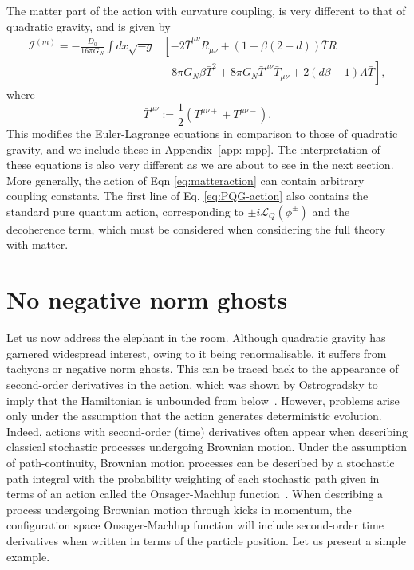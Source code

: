 \documentclass[aps,preprintnumbers,superscriptaddress,longbibliography]{revtex4-1}
\begin{document}
The matter part of the action with curvature coupling, is very different to that of quadratic gravity, and is given 
by   
\begin{equation}
\label{eq:matteraction}
\begin{split}
\mathcal{I}^{(m)}=
-\frac{D_0}{16 \pi G_N} \int dx \sqrt{-g} &
\left[-2 \bar{T}^{\mu\nu}R_{\mu\nu}+\left(1+\beta(2-d)\right) \bar{T}R \right.\\
&\left. - 8\pi G_N \beta\bar{T}^2+8\pi G_N \bar{T}^{\mu\nu}\bar{T}_{\mu\nu}+2 (d\beta-1)\Lambda\bar{T}
\right],
\end{split}
\end{equation}
where 
$$
\bar{T}^{\mu\nu}:=\frac{1}{2}\left({T}^{\mu\nu+}+{T}^{\mu\nu-}\right).
$$
This modifies the Euler-Lagrange equations in comparison to those of quadratic gravity, and we include these in Appendix~\ref{app: mpp}. The interpretation of these equations is also very different as we are about to see in the next section. More generally, the action of Eqn \eqref{eq:matteraction} can contain arbitrary coupling constants. The first line of Eq. \eqref{eq:PQG-action} also contains the standard pure quantum action, corresponding to $\pm i\mathcal{L}_Q(\phi^\pm)$ and the decoherence term, which must be considered when considering the full theory with matter. 


\section{No negative norm ghosts}
\label{sec:noghosts}
Let us now address the elephant in the room. Although quadratic gravity has garnered widespread interest, owing to it being renormalisable, it suffers from tachyons or negative norm ghosts. This can be traced back to the appearance of second-order derivatives in the action, which was shown by Ostrogradsky to imply that the Hamiltonian is unbounded from below~\cite{ostrogradsky1850memoire}. However, problems arise only under the assumption that the action generates deterministic evolution. Indeed, actions with second-order (time) derivatives often appear when describing classical stochastic processes undergoing Brownian motion. Under the assumption of path-continuity, Brownian motion processes can be described by a stochastic path integral with the probability weighting of each stochastic path given in terms of an action called the Onsager-Machlup function~\cite{Onsager1953Fluctuations}. When describing a process undergoing Brownian motion through kicks in momentum, the configuration space Onsager-Machlup function will include second-order time derivatives when written in terms of the particle position. Let us present a simple example.
\end{document}
